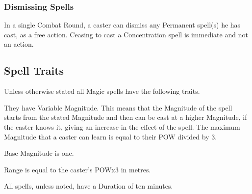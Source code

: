 \subsubsection{Dismissing Spells}
In a single Combat Round, a caster can dismiss any Permanent spell(s) he has cast, as a free action. Ceasing to cast a Concentration spell is immediate and not an action. 


\subsection{Spell Traits}
Unless otherwise stated all Magic spells have the following traits.

\begin{rpg-list}
\item They have Variable Magnitude. This means that the Magnitude of the spell starts from the stated Magnitude and then can be cast at a higher Magnitude, if the caster knows it, giving an increase in the effect of the spell. The maximum Magnitude that a caster can learn is equal to their POW divided by 3.
\item Base Magnitude is one. 
\item Range is equal to the caster’s POWx3 in metres.
\item All spells, unless noted, have a Duration of ten minutes.
\end{rpg-list}

